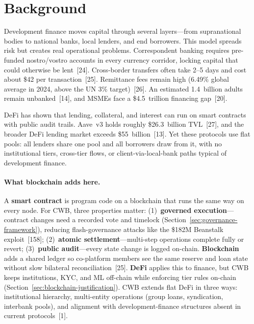 \documentclass[12pt,a4paper]{report}
\begin{document}
\section{Background}

Development finance moves capital through several layers---from supranational bodies to national banks, local lenders, and end borrowers. This model spreads risk but creates real operational problems. Correspondent banking requires pre-funded nostro/vostro accounts in every currency corridor, locking capital that could otherwise be lent~[24]. Cross-border transfers often take 2--5 days and cost about \$42 per transaction~[25]. Remittance fees remain high (6.49\% global average in 2024, above the UN 3\% target)~[26]. An estimated 1.4~billion adults remain unbanked~[14], and MSMEs face a \$4.5~trillion financing gap~[20].

DeFi has shown that lending, collateral, and interest can run on smart contracts with public audit trails. Aave~v3 holds roughly \$26.3~billion TVL~[27], and the broader DeFi lending market exceeds \$55~billion~[13]. Yet these protocols use flat pools: all lenders share one pool and all borrowers draw from it, with no institutional tiers, cross-tier flows, or client-via-local-bank paths typical of development finance.

\paragraph{What blockchain adds here.}
A \textbf{smart contract} is program code on a blockchain that runs the same way on every node. For CWB, three properties matter: (1)~\textbf{governed execution}---contract changes need a recorded vote and timelock (Section~\ref{sec:governance-framework}), reducing flash-governance attacks like the \$182M Beanstalk exploit~[158]; (2)~\textbf{atomic settlement}---multi-step operations complete fully or revert; (3)~\textbf{public audit}---every state change is logged on-chain. \textbf{Blockchain} adds a shared ledger so co-platform members see the same reserve and loan state without slow bilateral reconciliation~[25]. \textbf{DeFi} applies this to finance, but CWB keeps institutions, KYC, and ML off-chain while enforcing tier rules on-chain (Section~\ref{sec:blockchain-justification}). CWB extends flat DeFi in three ways: institutional hierarchy, multi-entity operations (group loans, syndication, interbank pools), and alignment with development-finance structures absent in current protocols~[1].
\end{document}
